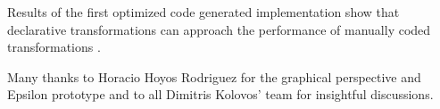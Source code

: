 \documentclass{jot}
\begin{document}

Results of the first optimized code generated implementation show that declarative transformations can approach the performance of manually coded transformations \cite{Willink-EXE2016}.  

\backmatter




\abouttheauthors

\begin{acknowledgments}
Many thanks to Horacio Hoyos Rodriguez for the graphical perspective and Epsilon prototype and to all Dimitris Kolovos' team for insightful discussions.
\end{acknowledgments}
\end{document}

